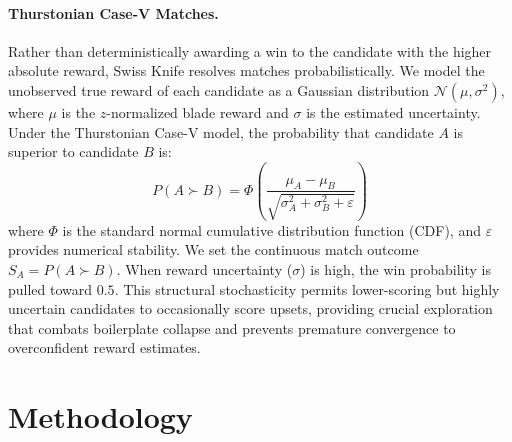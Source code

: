 \documentclass[letterpaper]{article} %
\begin{document}
\paragraph{Thurstonian Case-V Matches.}
Rather than deterministically awarding a win to the candidate with the higher absolute reward, Swiss Knife resolves matches probabilistically. We model the unobserved true reward of each candidate as a Gaussian distribution $\mathcal{N}(\mu, \sigma^2)$, where $\mu$ is the $z$-normalized blade reward and $\sigma$ is the estimated uncertainty. Under the Thurstonian Case-V model, the probability that candidate $A$ is superior to candidate $B$ is:
\[
P(A \succ B) = \Phi\left(\frac{\mu_A - \mu_B}{\sqrt{\sigma_A^2 + \sigma_B^2 + \varepsilon}}\right)
\]
where $\Phi$ is the standard normal cumulative distribution function (CDF), and $\varepsilon$ provides numerical stability. We set the continuous match outcome $S_A = P(A \succ B)$. When reward uncertainty ($\sigma$) is high, the win probability is pulled toward $0.5$. This structural stochasticity permits lower-scoring but highly uncertain candidates to occasionally score upsets, providing crucial exploration that combats boilerplate collapse and prevents premature convergence to overconfident reward estimates.

\section{Methodology}
\label{sec:method}
\end{document}
